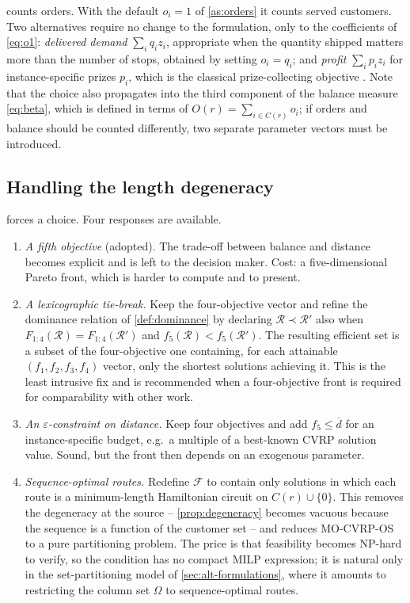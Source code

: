 \documentclass[11pt,a4paper]{article}
\theoremstyle{definition}
\theoremstyle{plain}
\newcommand{\Feas}{\mathcal{F}}
\newcommand{\Routes}{\mathcal{R}}
\begin{document}
 counts orders.  With the default $o_i = 1$ of \cref{as:orders} it
counts served customers.  Two alternatives require no change to the
formulation, only to the coefficients of \eqref{eq:o1}:
\emph{delivered demand} $\sum_{i} q_i z_i$, appropriate when the quantity
shipped matters more than the number of stops, obtained by setting
$o_i = q_i$; and \emph{profit} $\sum_i p_i z_i$ for instance-specific prizes
$p_i$, which is the classical prize-collecting objective
\cite{Archetti2014}.  Note that the choice also propagates into the third
component of the balance measure \eqref{eq:beta}, which is defined in terms of
$O(r) = \sum_{i \in C(r)} o_i$; if orders and balance should be counted
differently, two separate parameter vectors must be introduced.

\subsection{Handling the length degeneracy}
\label{sec:alt-f5}

 forces a choice.  Four responses are available.

\begin{enumerate}[label=(\alph*),leftmargin=*]
\item \emph{A fifth objective} (adopted).  The trade-off between balance and
  distance becomes explicit and is left to the decision maker.  Cost: a
  five-dimensional Pareto front, which is harder to compute and to present.
\item \emph{A lexicographic tie-break.}  Keep the four-objective vector and
  refine the dominance relation of \cref{def:dominance} by declaring
  $\Routes \prec \Routes'$ also when $F_{1:4}(\Routes) = F_{1:4}(\Routes')$ and
  $f_5(\Routes) < f_5(\Routes')$.  The resulting efficient set is a subset of
  the four-objective one containing, for each attainable
  $(f_1,f_2,f_3,f_4)$ vector, only the shortest solutions achieving it.  This
  is the least intrusive fix and is recommended when a four-objective front is
  required for comparability with other work.
\item \emph{An $\varepsilon$-constraint on distance.}  Keep four objectives and
  add $f_5 \le \overline{d}$ for an instance-specific budget, e.g.\ a multiple
  of a best-known CVRP solution value.  Sound, but the front then depends on an
  exogenous parameter.
\item \emph{Sequence-optimal routes.}  Redefine $\Feas$ to contain only
  solutions in which each route is a minimum-length Hamiltonian circuit on
  $C(r) \cup \{0\}$.  This removes the degeneracy at the source --
  \cref{prop:degeneracy} becomes vacuous because the sequence is a function of
  the customer set -- and reduces \textup{\textsc{MO-CVRP-OS}} to a pure partitioning
  problem.  The price is that feasibility becomes NP-hard to verify, so the
  condition has no compact MILP expression; it is natural only in the
  set-partitioning model of \cref{sec:alt-formulations}, where it amounts to
  restricting the column set $\Omega$ to sequence-optimal routes.
\end{enumerate}
\end{document}
